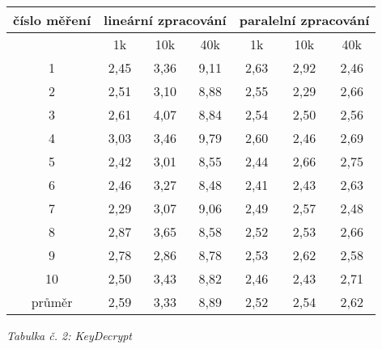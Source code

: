 \documentclass{article}
\begin{document}
\begin{center}
	\begin{tabular}{ c | c | c | c | c | c | c }
		\textbf{číslo měření} & \multicolumn{3}{c|}{\textbf{lineární zpracování}} & \multicolumn{3}{|c}{\textbf{paralelní zpracování}} \\
		\hline
		& 1k & 10k & 40k & 1k & 10k & 40k \\
		\hline
		\hline
		1 & 2,45 & 3,36 & 9,11 & 2,63 & 2,92 & 2,46 \\
		\hline
		2 & 2,51 & 3,10 & 8,88 & 2,55 & 2,29 & 2,66 \\
		\hline
		3 & 2,61 & 4,07 & 8,84 & 2,54 & 2,50 & 2,56 \\
		\hline
		4 & 3,03 & 3,46 & 9,79 & 2,60 & 2,46 & 2,69 \\
		\hline
		5 & 2,42 & 3,01 & 8,55 & 2,44 & 2,66 & 2,75 \\
		\hline
		6 & 2,46 & 3,27 & 8,48 & 2,41 & 2,43 & 2,63 \\
		\hline
		7 & 2,29 & 3,07 & 9,06 & 2,49 & 2,57 & 2,48 \\
		\hline
		8 & 2,87 & 3,65 & 8,58 & 2,52 & 2,53 & 2,66 \\
		\hline
		9 & 2,78 & 2,86 & 8,78 & 2,53 & 2,62 & 2,58 \\
		\hline
		10 & 2,50 & 3,43 & 8,82 & 2,46 & 2,43 & 2,71 \\
		\hline
		průměr & 2,59 & 3,33 & 8,89 & 2,52 & 2,54 & 2,62 \\
	\end{tabular}
	\newline
	\textit{Tabulka č. 2: KeyDecrypt}
\end{center}
\end{document}
